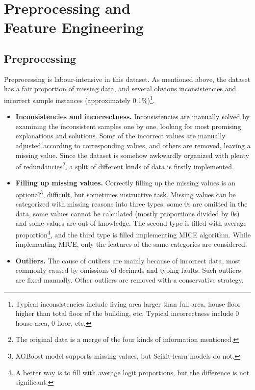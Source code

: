 \documentclass{article}
\begin{document}
\section{Preprocessing and \\ Feature Engineering}

\subsection{Preprocessing}

Preprocessing is labour-intensive in this dataset. As mentioned above, the dataset has a fair proportion of missing data, and several obvious inconsistencies and incorrect sample instances (approximately 0.1\%)\footnote{Typical inconsistencies include living area larger than full area, house floor higher than total floor of the building, etc. Typical incorrectness include 0 house area, 0 floor, etc.}.

\begin{itemize}
\item \textbf{Inconsistencies and incorrectness. } Inconsistencies are manually solved by examining the inconsistent samples one by one, looking for most promising explanations and solutions. Some of the incorrect values are manually adjusted according to corresponding values, and others are removed, leaving a missing value. Since the dataset is somehow awkwardly organized with plenty of redundancies\footnote{The original data is a merge of the four kinds of information mentioned.}, a split of different kinds of data is firstly implemented.
\item \textbf{Filling up missing values. }
    Correctly filling up the missing values is an optional\footnote{XGBoost model supports missing values, but Scikit-learn models do not.}, difficult, but sometimes instructive task. Missing values can be categorized with missing reasons into three types: some 0s are omitted in the data, some values cannot be calculated (mostly proportions divided by 0s) and some values are out of knowledge. The second type is filled with average proportion\footnote{A better way is to fill with average logit proportions, but the difference is not significant.}, and the third type is filled implementing MICE \cite{MICE} algorithm. While implementing MICE, only the features of the same categories are considered.
\item \textbf{Outliers. }
    The cause of outliers are mainly because of incorrect data, most commonly caused by omissions of decimals and typing faults. Such outliers are fixed manually. Other outliers are removed with a conservative strategy.
\end{itemize}
\end{document}
